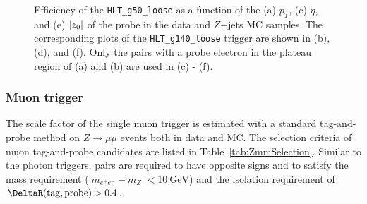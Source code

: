 \begin{figure}[!htb]
    \caption{Efficiency of the \texttt{HLT\_g50\_loose} as a function of the (a) $p_{T}$, (c) $\eta$, and (e) $|z_{0}|$ of the probe in the data and $Z$+jets MC samples. The corresponding plots of the \texttt{HLT\_g140\_loose} trigger are shown in (b), (d), and (f). Only the pairs with a probe electron in the plateau region of (a) and (b) are used in (c) - (f).
    }
    \label{fig:PhotonTrigEff}
\end{figure}




\subsubsection{Muon trigger}
\label{subsect:muonTrigEff}

The scale factor of the single muon trigger is estimated with a standard tag-and-probe method on $Z \rightarrow \mu\mu$ events both in data and MC. The selection criteria of muon tag-and-probe candidates are listed in Table~\ref{tab:ZmmSelection}. Similar to the photon triggers, pairs are required to have opposite signs and to satisfy the mass requirement ($|m_{e^{+}e^{-}} - m_{Z}| < 10~\si{\GeV}$) and the isolation requirement of $\DeltaR(\mathrm{tag}, \mathrm{probe}) > 0.4$. 


